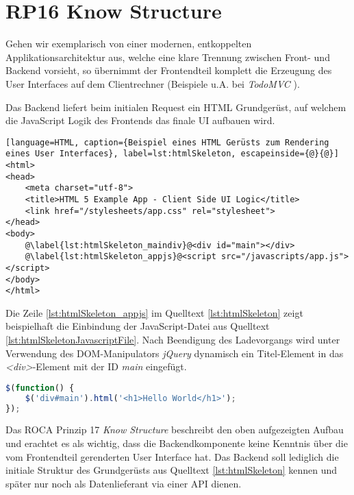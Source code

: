 \section{RP16 Know Structure}
\label{sec:principle-rp16-know-structure}

Gehen wir exemplarisch von einer modernen, entkoppelten Applikationsarchitektur aus, welche eine klare Trennung zwischen Front- und Backend vorsieht, so übernimmt der Frontendteil komplett die Erzeugung des User Interfaces auf dem Clientrechner (Beispiele u.A. bei \emph{TodoMVC} \cite{TodoMVC}).

Das Backend liefert beim initialen Request ein HTML Grundgerüst, auf welchem die JavaScript Logik des Frontends das finale UI aufbauen wird.

\begin{lstlisting}[language=HTML, caption={Beispiel eines HTML Gerüsts zum Rendering eines User Interfaces}, label=lst:htmlSkeleton, escapeinside={@}{@}]
<html>
<head>
	<meta charset="utf-8">
	<title>HTML 5 Example App - Client Side UI Logic</title>
	<link href="/stylesheets/app.css" rel="stylesheet">
</head>
<body>
	@\label{lst:htmlSkeleton_maindiv}@<div id="main"></div>
	@\label{lst:htmlSkeleton_appjs}@<script src="/javascripts/app.js"></script>
</body>
</html>
\end{lstlisting}

Die Zeile \autoref{lst:htmlSkeleton_appjs} im Quelltext \ref{lst:htmlSkeleton} zeigt beispielhaft die Einbindung der JavaScript-Datei aus Quelltext \ref{lst:htmlSkeletonJavascriptFile}. Nach Beendigung des Ladevorgangs wird unter Verwendung des \gls{DOM}-Manipulators \emph{jQuery} \cite{jQuery} dynamisch ein Titel-Element in das \emph{<div>}-Element mit der ID \emph{main} eingefügt.

\begin{lstlisting}[language=JavaScript, caption={JavaScript-Datei \emph{app.js} zu Quelltext \ref{lst:htmlSkeleton}}, label=lst:htmlSkeletonJavascriptFile]
$(function() {
	$('div#main').html('<h1>Hello World</h1>');
});
\end{lstlisting}

Das ROCA Prinzip 17 \emph{Know Structure} beschreibt den oben aufgezeigten Aufbau und erachtet es als wichtig, dass die Backendkomponente keine Kenntnis über die vom Frontendteil gerenderten User Interface hat. Das Backend soll lediglich die initiale Struktur des Grundgerüsts aus Quelltext \ref{lst:htmlSkeleton} kennen und später nur noch als Datenlieferant via einer API dienen.


